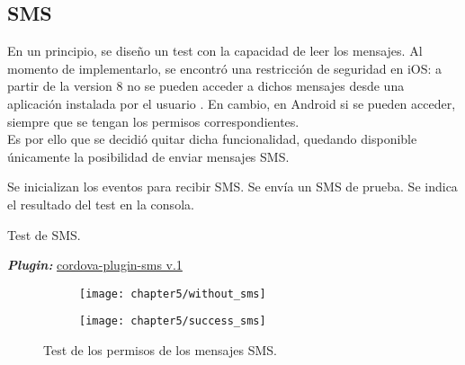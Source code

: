 \subsection{SMS}
En un principio, se diseño un test con la capacidad de leer los mensajes. Al momento de implementarlo, se encontró una restricción de seguridad en iOS: a partir de la version 8 no se pueden acceder a dichos mensajes desde una aplicación instalada por el usuario \cite{foda}. En cambio, en Android si se pueden acceder, siempre que se tengan los permisos correspondientes.\\
Es por ello que se decidió quitar dicha funcionalidad, quedando disponible únicamente la posibilidad de enviar mensajes SMS.\\
\begin{algorithm}
	\begin{algorithmic}[1]
		\STATE Se inicializan los eventos para recibir SMS. 
		\STATE Se envía un SMS de prueba.
		\STATE Se indica el resultado del test en la consola.
	\end{algorithmic}
	\caption{Test de SMS.}\label{alg:chap5_test_sms}
\end{algorithm}
\textbf{\emph{Plugin:}} \href{https://github.com/floatinghotpot/cordova-plugin-sms}{cordova-plugin-sms v.1}
\begin{figure}[hbtp]
    \centering
	\begin{subfigure}{.3\linewidth}
		\texttt{[image: chapter5/without\_sms]}
		\label{fig:ch05:without_sms}
	\end{subfigure}
	\begin{subfigure}{.3\linewidth}
	    \centering
		\texttt{[image: chapter5/success\_sms]}
		\label{fig:ch05:with_sms}
	\end{subfigure}
	\caption{Test de los permisos de los mensajes SMS.}
	\label{fig:chapter05:sms_test}
\end{figure}
\newpage
